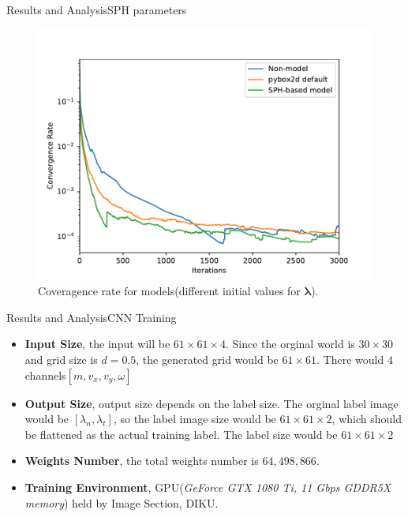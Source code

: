 \documentclass{beamer}
\begin{document}
\begin{frame}{Results and Analysis}{SPH parameters}
\begin{figure}[!ht]
        \centering
        \includegraphics[scale=0.4]{../report/Figures/final_SPH.pdf}
        \caption{Coveragence rate for models(different initial values for $\pmb{\lambda}$).}
\end{figure}
\end{frame}
\begin{frame}{Results and Analysis}{CNN Training}
\begin{itemize}
	\pause
        \item \textbf{Input Size}, the input will be $61\times61\times4$. Since the orginal world is $30\times30$ and grid size is $d=0.5$, the generated grid would be $61\times61$. There would $4$ channels$[m, v_x, v_y, \omega]$
        \pause
	\item \textbf{Output Size}, output size depends on the label size. The orginal label image would be $[\lambda_n, \lambda_t]$, so the label image size would be $61\times61\times2$, which should be flattened as the actual training label. The label size would be $61\times 61 \times 2$
        \pause
	\item \textbf{Weights Number}, the total weights number is $64,498,866$.
	\pause
	\item \textbf{Training Environment}, GPU(\textit{GeForce GTX 1080 Ti, 11 Gbps GDDR5X memory}) held by Image Section, DIKU.
\end{itemize}
\end{frame}
\end{document}
